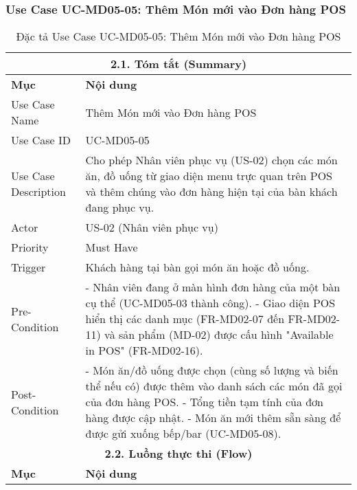 \begin{longtable}{|m{4cm}|p{11cm}|}
\hline
\end{longtable}

\subsubsection{Use Case UC-MD05-05: Thêm Món mới vào Đơn hàng POS}
\begin{longtable}{|m{4cm}|p{11cm}|}
\caption{Đặc tả Use Case UC-MD05-05: Thêm Món mới vào Đơn hàng POS} \label{tab:uc_md05_05_final} \\
\hline
\multicolumn{2}{|c|}{\textbf{2.1. Tóm tắt (Summary)}} \\
\hline
\textbf{Mục} & \textbf{Nội dung} \\
\hline
\endhead %
\hline
\endfoot %
\hline
\endlastfoot %
Use Case Name & Thêm Món mới vào Đơn hàng POS \\
\hline
Use Case ID & UC-MD05-05 \\
\hline
Use Case Description & Cho phép Nhân viên phục vụ (US-02) chọn các món ăn, đồ uống từ giao diện menu trực quan trên POS và thêm chúng vào đơn hàng hiện tại của bàn khách đang phục vụ. \\
\hline
Actor & US-02 (Nhân viên phục vụ) \\
\hline
Priority & Must Have \\
\hline
Trigger & Khách hàng tại bàn gọi món ăn hoặc đồ uống. \\
\hline
Pre-Condition & - Nhân viên đang ở màn hình đơn hàng của một bàn cụ thể (UC-MD05-03 thành công). \newline - Giao diện POS hiển thị các danh mục (FR-MD02-07 đến FR-MD02-11) và sản phẩm (MD-02) được cấu hình "Available in POS" (FR-MD02-16). \\
\hline
Post-Condition & - Món ăn/đồ uống được chọn (cùng số lượng và biến thể nếu có) được thêm vào danh sách các món đã gọi của đơn hàng POS. \newline - Tổng tiền tạm tính của đơn hàng được cập nhật. \newline - Món ăn mới thêm sẵn sàng để được gửi xuống bếp/bar (UC-MD05-08). \\
\hline
\multicolumn{2}{|c|}{\textbf{2.2. Luồng thực thi (Flow)}} \\
\hline
\textbf{Mục} & \textbf{Nội dung} \\
\hline

\end{longtable}
